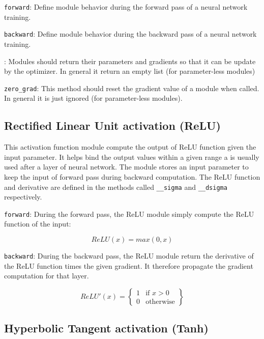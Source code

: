 \documentclass[10pt,conference,compsocconf]{IEEEtran}
\begin{document}
\texttt{forward}: Define module behavior during the forward pass of a neural network training.

\texttt{backward}: Define module behavior during the backward pass of a neural network training. 

: Modules should return their parameters and gradients so that it can be update by the optimizer. In general it return an empty list (for parameter-less modules)

\texttt{zero\_grad}: This method should reset the gradient value of a module when called. In general it is just ignored (for parameter-less modules).

\subsection{Rectified Linear Unit activation (ReLU)}

This activation function module compute the output of ReLU function given the input parameter. It helps bind the output values within a given range a is usually used after a layer of neural network. The module stores an input parameter to keep the input of forward pass during backward computation. The ReLU function and derivative are defined in the methods called \texttt{\_\_sigma} and \texttt{\_\_dsigma} respectively.

\texttt{forward}: During the forward pass, the ReLU module simply compute the ReLU function of the input:

\begin{equation}
   ReLU(x) = max(0, x) 
\end{equation}

\texttt{backward}: During the backward pass, the ReLU module return the derivative of the ReLU function times the given gradient. It therefore propagate the gradient computation for that layer. 

\begin{equation}
    ReLU'(x) = \left\{
    \begin{array}{lr}
        1 &  \textrm{if }x > 0\\
        0 & \textrm{otherwise}
    \end{array}\right\}
    
\end{equation}


\subsection{Hyperbolic Tangent activation (Tanh)}
\end{document}
